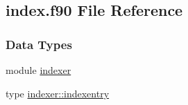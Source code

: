 \hypertarget{index_8f90}{\subsection{index.\-f90 File Reference}
\label{index_8f90}
}
\subsubsection*{Data Types}
\begin{DoxyCompactItemize}
\item 
module \hyperlink{classindexer}{indexer}
\item 
type \hyperlink{structindexer_1_1indexentry}{indexer\-::indexentry}
\end{DoxyCompactItemize}
